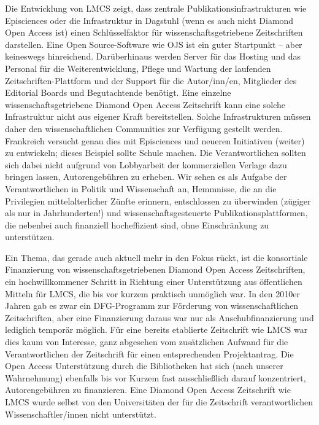 \documentclass[a4paper,
fontsize=11pt,
oneside,
numbers=noperiodatend,
parskip=half-,
bibliography=totoc,
final
]{scrartcl}
\begin{document}
Die Entwicklung von LMCS zeigt, dass zentrale
Publikationsinfrastrukturen wie Episciences oder die Infrastruktur in
Dagstuhl (wenn es auch nicht Diamond Open Access ist) einen
Schlüsselfaktor für wissenschaftsgetriebene Zeitschriften darstellen.
Eine Open Source-Software wie OJS ist ein guter Startpunkt -- aber
keineswegs hinreichend. Darüberhinaus werden Server für das Hosting und
das Personal für die Weiterentwicklung, Pflege und Wartung der laufenden
Zeitschriften-Plattform und der Support für die Autor/inn/en, Mitglieder
des Editorial Boards und Begutachtende benötigt. Eine einzelne
wissenschaftsgetriebene Diamond Open Access Zeitschrift kann eine solche
Infrastruktur nicht aus eigener Kraft bereitstellen. Solche
Infrastrukturen müssen daher den wissenschaftlichen Communities zur
Verfügung gestellt werden. Frankreich versucht genau dies mit
Episciences und neueren Initiativen (weiter) zu entwickeln; dieses
Beispiel sollte Schule machen. Die Verantwortlichen sollten sich dabei
nicht aufgrund von Lobbyarbeit der kommerziellen Verlage dazu bringen
lassen, Autorengebühren zu erheben. Wir sehen es als Aufgabe der
Verantwortlichen in Politik und Wissenschaft an, Hemmnisse, die an die
Privilegien mittelalterlicher Zünfte erinnern, entschlossen zu
überwinden (zügiger als nur in Jahrhunderten!) und
wissenschaftsgesteuerte Publikationsplattformen, die nebenbei auch
finanziell hocheffizient sind, ohne Einschränkung zu unterstützen.

Ein Thema, das gerade auch aktuell mehr in den Fokus rückt, ist die
konsortiale Finanzierung von wissenschaftsgetriebenen Diamond Open
Access Zeitschriften, ein hochwillkommener Schritt in Richtung einer
Unterstützung aus öffentlichen Mitteln für LMCS, die bis vor kurzem
praktisch unmöglich war. In den 2010er Jahren gab es zwar ein
DFG-Programm zur Förderung von wissenschaftlichen Zeitschriften, aber
eine Finanzierung daraus war nur als Anschubfinanzierung und lediglich
temporär möglich. Für eine bereits etablierte Zeitschrift wie LMCS war
dies kaum von Interesse, ganz abgesehen vom zusätzlichen Aufwand für die
Verantwortlichen der Zeitschrift für einen entsprechenden Projektantrag.
Die Open Access Unterstützung durch die Bibliotheken hat sich (nach
unserer Wahrnehmung) ebenfalls bis vor Kurzem fast ausschließlich darauf
konzentriert, Autorengebühren zu finanzieren. Eine Diamond Open Access
Zeitschrift wie LMCS wurde selbst von den Universitäten der für die
Zeitschrift verantwortlichen Wissenschaftler/innen nicht unterstützt.
\end{document}
